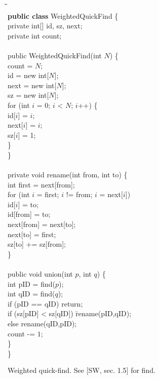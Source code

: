 \documentclass{tstextbook}
\begin{document}
\begin{figure}
  \begin{tabbing}
   \quad\=\quad\=\quad\=\kill\\
    \textbf{public class} WeightedQuickFind \{\\
\>  private int[] id, sz, next;\\
\>  private int count;\\
\>\\
    \>  public WeightedQuickFind(int $N$)  \{\\
   \> \>    count = $N$;\\
    \>\>    id = new int[$N$];\\
    \>\>    next = new int[$N$];\\
    \>\>    sz = new int[$N$];\\
    \>\>    for (int $i$ = 0; $i$ < $N$; $i$++) \{ \\
\>\>\>      id[$i$] = $i$;\\
\>\>\>   next[$i$] = $i$;\\
    \>\>\>      sz[$i$] = 1;\\
\>\>    \}\\
\>  \}\\
\>\\
\>  private void rename(int from, int to) \{ \\
\>\>    int first = next[from];\\
    \>\>    for (int $i$ = first; $i$ != from; $i$ = next[$i$])\\
\>\>\>	id[$i$] = to;\\
\>\>    id[from] = to;\\
\> \>   next[from] = next[to];\\
\>  \>  next[to] = first;\\
\> \>   sz[to] += sz[from];\\
\>  \}\\
\>\\
\>  public void union(int $p$, int $q$) \{\\ 
    \>\>    int pID = find($p$); \\
\>\>    int qID = find($q$);\\
\>\>    if (pID == qID) return;\\
    \>\>    if (sz[pID] < sz[qID]) \= rename(pID,qID);\\
\>   \> else                  \> rename(qID,pID);\\
\>\>    count -= $1$;\\
\>  \}\\
\}
  \end{tabbing}
\caption{\label{fig: WUF impl}Weighted quick-find. 
  See [SW, sec. 1.5] for find.}
\end{figure}
\end{document}

